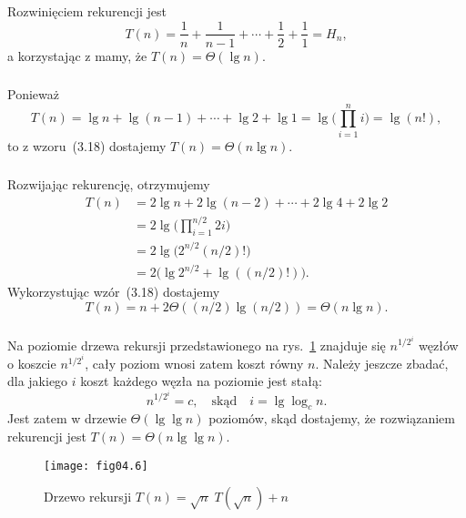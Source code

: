\subsubsection{} %
Rozwinięciem rekurencji jest
\[
	T(n) = \frac{1}{n}+\frac{1}{n-1}+\cdots+\frac{1}{2}+\frac{1}{1} = H_n,
\]
a korzystając z  mamy, że $T(n)=\Theta(\lg n)$.

\subsubsection{} %
Ponieważ
\[
	T(n) = \lg n+\lg(n-1)+\cdots+\lg2+\lg 1 = \lg\biggl(\prod_{i=1}^ni\biggr) = \lg(n!),
\]
to z wzoru~(3.18) dostajemy $T(n)=\Theta(n\lg n)$.

\subsubsection{} %
Rozwijając rekurencję, otrzymujemy
\begin{align*}
	T(n) &= 2\lg n+2\lg(n-2)+\cdots+2\lg4+2\lg2 \\
	&= 2\lg\biggl(\prod_{i=1}^{n/2}2i\biggr) \\
	&= 2\lg\bigl(2^{n/2}(n/2)!\bigr) \\
	&= 2\bigl(\lg 2^{n/2}+\lg((n/2)!)\bigr).
\end{align*}
Wykorzystując wzór~(3.18) dostajemy
\[
	T(n) = n+2\Theta((n/2)\lg (n/2)) = \Theta(n\lg n).
\]

\subsubsection{} %
Na  poziomie drzewa rekursji przedstawionego na rys.~\ref{fig:4-4j} znajduje się $n^{1/2^i}$ węzłów o koszcie $n^{1/2^i}$, cały poziom wnosi zatem koszt równy $n$. Należy jeszcze zbadać, dla jakiego $i$ koszt każdego węzła na  poziomie jest stałą:
\[
	n^{1/2^i} = c, \quad\text{skąd}\quad i = \lg\log_cn.
\]
Jest zatem w drzewie $\Theta(\lg\lg n)$ poziomów, skąd dostajemy, że rozwiązaniem rekurencji jest $T(n)=\Theta(n\lg\lg n)$.
\begin{figure}[ht]
	\begin{center}
		\texttt{[image: fig04.6]}
	\caption{Drzewo rekursji $T(n)=\sqrt{n}\;T(\!\sqrt{n})+n$} \label{fig:4-4j}
	\end{center}
\end{figure}

